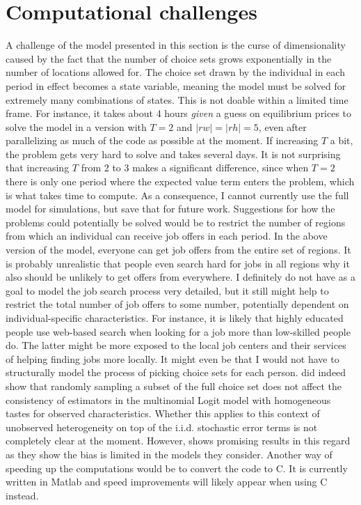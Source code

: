 \section{Computational challenges}
A challenge of the model presented in this section is the curse of dimensionality caused by the fact that the number of choice sets grows exponentially in the number of locations allowed for. The choice set drawn by the individual in each period in effect becomes a state variable, meaning the model must be solved for extremely many combinations of states. This is not doable within a limited time frame. For instance, it takes about 4 hours \textit{given} a guess on equilibrium prices to solve the model in a version with $T=2$ and $|rw|=|rh|=5$, even after parallelizing as much of the code as possible at the moment. If increasing $T$ a bit, the problem gets very hard to solve and takes several days. It is not surprising that increasing $T$ from 2 to 3 makes a significant difference, since when $T=2$ there is only one period where the expected value term enters the problem, which is what takes time to compute. As a consequence, I cannot currently use the full model for simulations, but save that for future work. Suggestions for how the problems could potentially be solved would be to restrict the number of regions from which an individual can receive job offers in each period. In the above version of the model, everyone can get job offers from the entire set of regions. It is probably unrealistic that people even search hard for jobs in all regions why it also should be unlikely to get offers from everywhere. I definitely do not have as a goal to model the job search process very detailed, but it still might help to restrict the total number of job offers to some number, potentially dependent on individual-specific characteristics. For instance, it is likely that highly educated people use web-based search when looking for a job more than low-skilled people do. The latter might be more exposed to the local job centers and their services of helping finding jobs more locally. It might even be that I would not have to structurally model the process of picking choice sets for each person. \citet{McFadden1978} did indeed show that randomly sampling a subset of the full choice set does not affect the consistency of estimators in the multinomial Logit model with homogeneous tastes for observed characteristics. Whether this applies to this context of unobserved heterogeneity on top of the i.i.d. stochastic error terms is not completely clear at the moment. However, \citet{Keane2012} shows promising results in this regard as they show the bias is limited in the models they consider. Another way of speeding up the computations would be to convert the code to C. It is currently written in Matlab and speed improvements will likely appear when using C instead. 
